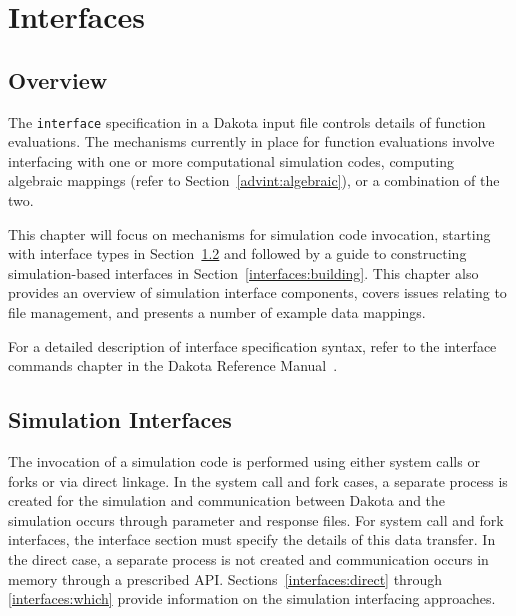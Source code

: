 \providecommand{\tightlist}{%
  \setlength{\itemsep}{0pt}\setlength{\parskip}{0pt}}
\chapter{Interfaces}\label{interfaces}


\section{Overview}\label{interfaces:overview}

The \texttt{interface} specification in a Dakota input file controls
details of function evaluations. The mechanisms currently in place for
function evaluations involve interfacing with one or more
computational simulation codes, computing algebraic mappings (refer to
Section~\ref{advint:algebraic}), or a combination of the two.


This chapter will focus on mechanisms for simulation code invocation,
starting with interface types in Section~\ref{interfaces:sim} and
followed by a guide to constructing simulation-based interfaces in
Section~\ref{interfaces:building}.  This chapter also provides an
overview of simulation interface components, covers issues relating to
file management, and presents a number of example data mappings.

For a detailed description of interface specification syntax, refer to
the interface commands chapter in the Dakota Reference Manual~\cite{RefMan}.


\section{Simulation Interfaces}\label{interfaces:sim}

The invocation of a simulation code is performed using either system
calls or forks or via direct linkage. In the system call and fork
cases, a separate process is created for the simulation and
communication between Dakota and the simulation occurs through
parameter and response files. For system call and fork interfaces, the
interface section must specify the details of this data transfer.  In
the direct case, a separate process is not created and communication
occurs in memory through a prescribed API.
Sections~\ref{interfaces:direct} through \ref{interfaces:which}
provide information on the simulation interfacing approaches.

